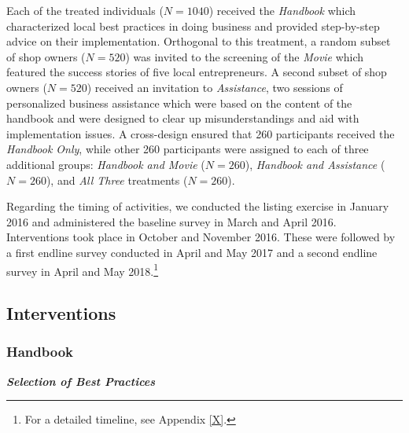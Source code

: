 \documentclass[11.5pt]{article}
\begin{document}
{Each of the treated individuals ($N = 1040$) received the \emph{Handbook} which characterized local best practices in doing business and provided step-by-step advice on their implementation. Orthogonal to this treatment, a random subset of shop owners ($N = 520$) was invited to the screening of the \emph{Movie} which featured the success stories of five local entrepreneurs. A second subset of shop owners ($N = 520$) received an invitation to \emph{Assistance}, two sessions of personalized business assistance which were based on the content of the handbook and were designed to clear up misunderstandings and aid with implementation issues. A cross-design ensured that 260 participants received the \emph{Handbook Only}, while other 260 participants were assigned to each of three additional groups: \emph{Handbook and Movie} ($N = 260$), \emph{Handbook and Assistance} ($N = 260$), and \emph{All Three} treatments ($N = 260$).

Regarding the timing of activities, we conducted the listing exercise in January 2016 and administered the baseline survey in March and April 2016. Interventions took place in October and November 2016. These were followed by a first endline survey conducted in April and May 2017 and a second endline survey in April and May 2018.\footnote{For a detailed timeline, see Appendix \ref{X}.}

\subsection{Interventions}

\subsubsection{Handbook}

\emph{\textbf{Selection of Best Practices}}\

}
\end{document}
